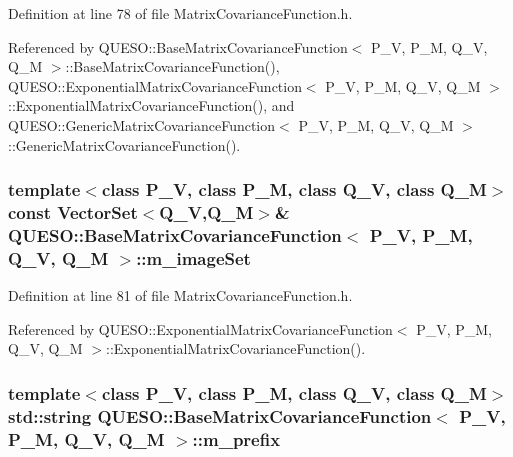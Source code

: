 Definition at line 78 of file Matrix\-Covariance\-Function.\-h.



Referenced by Q\-U\-E\-S\-O\-::\-Base\-Matrix\-Covariance\-Function$<$ P\-\_\-\-V, P\-\_\-\-M, Q\-\_\-\-V, Q\-\_\-\-M $>$\-::\-Base\-Matrix\-Covariance\-Function(), Q\-U\-E\-S\-O\-::\-Exponential\-Matrix\-Covariance\-Function$<$ P\-\_\-\-V, P\-\_\-\-M, Q\-\_\-\-V, Q\-\_\-\-M $>$\-::\-Exponential\-Matrix\-Covariance\-Function(), and Q\-U\-E\-S\-O\-::\-Generic\-Matrix\-Covariance\-Function$<$ P\-\_\-\-V, P\-\_\-\-M, Q\-\_\-\-V, Q\-\_\-\-M $>$\-::\-Generic\-Matrix\-Covariance\-Function().

\hypertarget{class_q_u_e_s_o_1_1_base_matrix_covariance_function_aa6e05a29048771a3a327b82cea09d480}{
\subsubsection[{m\-\_\-image\-Set}]{\setlength{\rightskip}{0pt plus 5cm}template$<$class P\-\_\-\-V, class P\-\_\-\-M, class Q\-\_\-\-V, class Q\-\_\-\-M$>$ const {\bf Vector\-Set}$<$Q\-\_\-\-V,Q\-\_\-\-M$>$\& {\bf Q\-U\-E\-S\-O\-::\-Base\-Matrix\-Covariance\-Function}$<$ P\-\_\-\-V, P\-\_\-\-M, Q\-\_\-\-V, Q\-\_\-\-M $>$\-::m\-\_\-image\-Set\hspace{0.3cm}{\ttfamily [protected]}}}\label{class_q_u_e_s_o_1_1_base_matrix_covariance_function_aa6e05a29048771a3a327b82cea09d480}


Definition at line 81 of file Matrix\-Covariance\-Function.\-h.



Referenced by Q\-U\-E\-S\-O\-::\-Exponential\-Matrix\-Covariance\-Function$<$ P\-\_\-\-V, P\-\_\-\-M, Q\-\_\-\-V, Q\-\_\-\-M $>$\-::\-Exponential\-Matrix\-Covariance\-Function().

\hypertarget{class_q_u_e_s_o_1_1_base_matrix_covariance_function_a05865387f77ce48e71ab2448982c5616}{
\subsubsection[{m\-\_\-prefix}]{\setlength{\rightskip}{0pt plus 5cm}template$<$class P\-\_\-\-V, class P\-\_\-\-M, class Q\-\_\-\-V, class Q\-\_\-\-M$>$ std\-::string {\bf Q\-U\-E\-S\-O\-::\-Base\-Matrix\-Covariance\-Function}$<$ P\-\_\-\-V, P\-\_\-\-M, Q\-\_\-\-V, Q\-\_\-\-M $>$\-::m\-\_\-prefix\hspace{0.3cm}{\ttfamily [protected]}}}\label{class_q_u_e_s_o_1_1_base_matrix_covariance_function_a05865387f77ce48e71ab2448982c5616}


